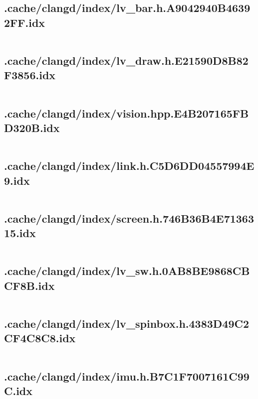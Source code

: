 \subsection{.cache/clangd/index/lv_bar.h.A9042940B46392FF.idx}
\inputminted[linenos,tabsize=2,breaklines, breakanywhere]{c}{lv_bar.h.A9042940B46392FF.idx}
\pagebreak

\subsection{.cache/clangd/index/lv_draw.h.E21590D8B82F3856.idx}
\inputminted[linenos,tabsize=2,breaklines, breakanywhere]{c}{lv_draw.h.E21590D8B82F3856.idx}
\pagebreak

\subsection{.cache/clangd/index/vision.hpp.E4B207165FBD320B.idx}
\inputminted[linenos,tabsize=2,breaklines, breakanywhere]{c}{vision.hpp.E4B207165FBD320B.idx}
\pagebreak

\subsection{.cache/clangd/index/link.h.C5D6DD04557994E9.idx}
\inputminted[linenos,tabsize=2,breaklines, breakanywhere]{c}{link.h.C5D6DD04557994E9.idx}
\pagebreak

\subsection{.cache/clangd/index/screen.h.746B36B4E7136315.idx}
\inputminted[linenos,tabsize=2,breaklines, breakanywhere]{c}{screen.h.746B36B4E7136315.idx}
\pagebreak

\subsection{.cache/clangd/index/lv_sw.h.0AB8BE9868CBCF8B.idx}
\inputminted[linenos,tabsize=2,breaklines, breakanywhere]{c}{lv_sw.h.0AB8BE9868CBCF8B.idx}
\pagebreak

\subsection{.cache/clangd/index/lv_spinbox.h.4383D49C2CF4C8C8.idx}
\inputminted[linenos,tabsize=2,breaklines, breakanywhere]{c}{lv_spinbox.h.4383D49C2CF4C8C8.idx}
\pagebreak

\subsection{.cache/clangd/index/imu.h.B7C1F7007161C99C.idx}
\inputminted[linenos,tabsize=2,breaklines, breakanywhere]{c}{imu.h.B7C1F7007161C99C.idx}
\pagebreak

